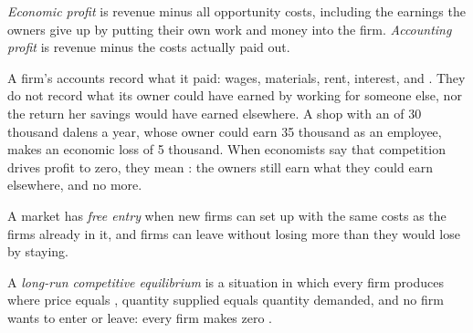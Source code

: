 \begin{definition}\label{def:g11:perfect-competition:economic-profit}
\emph{Economic profit} is revenue minus all opportunity costs, including the earnings the owners give up by putting their own work and
money into the firm. \emph{Accounting profit}\label{def:g11:perfect-competition:accounting-profit} is revenue minus the
costs actually paid out.
\end{definition}

\begin{measure}
A firm's accounts record what it paid: wages, materials, rent, interest, and . They do not record what its owner could have earned by
working for someone else, nor the return her savings would have earned elsewhere. A shop with an  of 30 thousand dalens a year, whose owner
could earn 35 thousand as an employee, makes an economic loss of 5 thousand. When economists say that competition drives profit to zero, they mean : the owners still earn what they could earn elsewhere, and no more.
\end{measure}

\begin{definition}\label{def:g11:perfect-competition:free-entry}
A market has \emph{free entry} when new firms can set up with the same costs as the firms already in it, and firms can leave without losing more
than they would lose by staying.
\end{definition}

\begin{definition}\label{def:g11:perfect-competition:long-run-equilibrium}
A \emph{long-run competitive equilibrium} is a situation in which every firm produces where price equals ,
quantity supplied equals quantity demanded, and no firm wants to enter or leave: every firm makes zero .
\end{definition}

